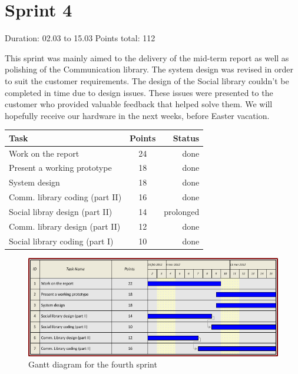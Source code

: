 \newpage


\section{Sprint 4}

Duration: 02.03 to 15.03
Points total: 112

This sprint was mainly aimed to the delivery of the mid-term report as well
as polishing of the Communication library. The system design was revised in
order to suit the customer requirements. The design of the Social library couldn't
be completed in time due to design issues. These issues were presented to the
customer who provided valuable feedback that helped solve them.
We will hopefully receive our hardware in the next weeks, before Easter vacation.

\begin{table}[ht!]
\begin{tabular}{ | l | c | r | }

\hline
\textbf{Task} & \textbf{Points} & \textbf{Status} \\
\hline

Work on the report			& 24 & done \\
\hline
Present a working prototype		& 18 & done \\
\hline
System design				& 18 & done \\
\hline
Comm. library coding (part II)      & 16 & done \\
\hline
Social libray design (part II)		& 14 & prolonged \\
\hline
Comm. library design (part II)      & 12 & done \\
\hline
Social library coding (part I)		& 10 & done \\
\hline



\end{tabular}
\end{table}

\begin{figure}[h!]
\centering \includegraphics[scale=0.8]{img/sprints-gantt4.png}
\caption{Gantt diagram for the fourth sprint}
\label{fig:sprints-gantt4}
\end{figure}

